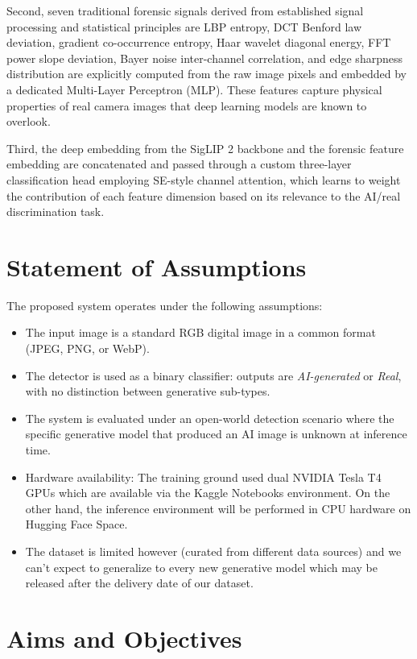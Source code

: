 Second, seven traditional forensic signals derived from established signal processing and statistical principles are LBP entropy, DCT Benford law deviation, gradient co-occurrence entropy, Haar wavelet diagonal energy, FFT power slope deviation, Bayer noise inter-channel correlation, and edge sharpness distribution are explicitly computed from the raw image pixels and embedded by a dedicated Multi-Layer Perceptron (MLP). These features capture physical properties of real camera images that deep learning models are known to overlook.

Third, the deep embedding from the SigLIP 2 backbone and the forensic feature embedding are concatenated and passed through a custom three-layer classification head employing SE-style channel attention, which learns to weight the contribution of each feature dimension based on its relevance to the AI/real discrimination task.

\section{Statement of Assumptions}

The proposed system operates under the following assumptions:

\begin{itemize}
    \item The input image is a standard RGB digital image in a common format (JPEG, PNG, or WebP).
    \item The detector is used as a binary classifier: outputs are \textit{AI-generated} or \textit{Real}, with no distinction between generative sub-types.
    \item The system is evaluated under an open-world detection scenario where the specific generative model that produced an AI image is unknown at inference time.
    \item Hardware availability: The training ground used dual NVIDIA Tesla T4 GPUs which are available via the Kaggle Notebooks environment. On the other hand, the inference environment will be performed in CPU hardware on Hugging Face Space.
    \item The dataset is limited however (curated from different data sources) and we can’t expect to generalize to every new generative model which may be released after the delivery date of our dataset.
\end{itemize}

\section{Aims and Objectives}

